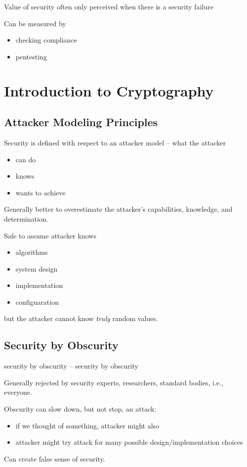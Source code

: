 \documentclass[draft]{article}
\begin{document}
Value of security often only perceived when there is a security failure

Can be measured by
\begin{itemize}[nosep]
    \item checking compliance
    \item pentesting
\end{itemize}
\section{Introduction to Cryptography}
\subsection{Attacker Modeling Principles}
Security is defined with respect to an \gls{attacker model} -- what the attacker
\begin{itemize}[nosep]
    \item can do
    \item knows
    \item wants to achieve
\end{itemize}

Generally better to overestimate the attacker's capabilities, knowledge, and determination.

Safe to assume attacker knows
\begin{itemize}[nosep]
    \item algorithms
    \item system design
    \item implementation
    \item configuaration
\end{itemize}
but the attacker cannot know \emph{truly} random values.
\subsection{Security by Obscurity}
\Gls{security by obscurity} -- \glsdesc*{security by obscurity}

Generally rejected by security experts, researchers, standard bodies, i.e., everyone.

Obscurity can slow down, but not stop, an attack:
\begin{itemize}[nosep]
    \item if we thought of something, attacker might also
    \item attacker might try attack for many possible design/implementation choices
\end{itemize}
Can create false sense of security.
\end{document}
